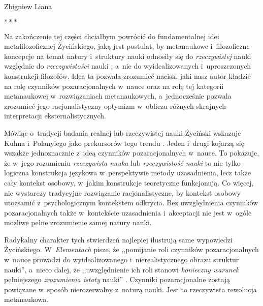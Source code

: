 \begin{artplenv}{Zbigniew Liana}
\pagebreak %
\medskip
{\centering$\ast\ast\ast$\par}
\smallskip


Na zakończenie tej części chciałbym powrócić do fundamentalnej idei metafilozoficznej Życińskiego, jaką jest postulat,
by metanaukowe i~filozoficzne koncepcje na temat natury i~struktury nauki odnosiły się do \textit{rzeczywistej} nauki
względnie do \textit{rzeczywistości} nauki
\parencite*[s.~16 i~126]{zycinski_elementy_1996},
a~nie do wyidealizowanych i~uproszczonych
konstrukcji filozofów. Idea ta pozwala zrozumieć nacisk, jaki nasz autor kładzie na rolę czynników pozaracjonalnych w~nauce
oraz na rolę tej kategorii metanaukowej w~rozwiązaniach metanaukowych, a~jednocześnie pozwala zrozumieć jego
racjonalistyczny optymizm w~obliczu różnych skrajnych interpretacji eksternalistycznych.

Mówiąc o~tradycji badania realnej lub rzeczywistej nauki Życiński wskazuje Kuhna i~Polanyiego jako prekursorów tego
trendu
\parencites[s.~153.169]{zycinski_jezyk_1983}[s.~231]{zycinski_elementy_1996}.
Jeden i~drugi kojarzą się wszakże
jednoznacznie z~ideą czynników pozaracjonalnych w~nauce. To pokazuje, że w~jego rozumieniu \textit{rzeczywista nauka} lub
\textit{rzeczywistość nauki} to nie tylko logiczna konstrukcja językowa w~perspektywie metody uzasadnienia, lecz także
cały kontekst osobowy, w~jakim konstrukcje teoretyczne funkcjonują. Co więcej, nie wystarczy tradycyjne rozwiązanie
racjonalistyczne, by kontekst osobowy utożsamić z~psychologicznym kontekstem odkrycia. Bez uwzględnienia czynników
pozaracjonalnych także w~kontekście uzasadnienia i~akceptacji nie jest w~ogóle możliwe pełne zrozumienie samej natury
nauki.

Radykalny charakter tych stwierdzeń najlepiej ilustrują same wypowiedzi Życińskiego. W~\textit{Elementach} pisze, że
,,pomijanie roli czynników pozaracjonalnych w~nauce prowadzi do wyidealizowanego i~nierealistycznego obrazu struktur
nauki'',
a~nieco dalej, że ,,uwzględnienie ich roli stanowi
\textit{konieczny warunek} pełniejszego \textit{zrozumienia istoty} nauki''
\parencite[s.~189.190, podkreślenia moje]{zycinski_elementy_1996}.
 Czynniki pozaracjonalne zostają powiązane w~sposób nierozerwalny z~naturą nauki. Jest to
rzeczywista rewolucja metanaukowa.


\end{artplenv}

